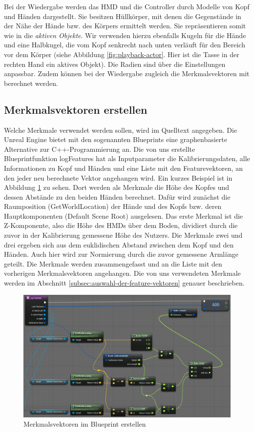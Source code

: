 Bei der Wiedergabe werden das HMD und die Controller durch Modelle von Kopf und Händen dargestellt. Sie besitzen Hüllkörper, mit denen die Gegenstände in der Nähe der Hände bzw. des Körpers ermittelt werden. Sie repräsentieren somit wie in \cite{scene-grok} die \textit{aktiven Objekte}. Wir verwenden hierzu ebenfalls Kugeln für die Hände und eine Halbkugel, die vom Kopf senkrecht nach unten verläuft für den Bereich vor dem Körper (siehe Abbildung \ref{fig:playback-actor}. Hier ist die Tasse in der rechten Hand ein aktives Objekt). Die Radien sind über die Einstellungen anpassbar. Zudem können bei der Wiedergabe zugleich die Merkmalsvektoren mit berechnet werden.

\subsection{Merkmalsvektoren erstellen}
\label{subsec:merkmalsvektoren-erstellen}
Welche Merkmale verwendet werden sollen, wird im Quelltext angegeben. Die Unreal Engine bietet mit den sogenannten Blueprints eine graphenbasierte Alternative zur C++-Programmierung an. Die von uns erstellte Blueprintfunktion \glqq{}logFeatures\grqq{} hat als Inputparameter die Kalibrierungsdaten, alle Informationen zu Kopf und Händen und eine Liste mit den Featurevektoren, an den jeder neu berechnete Vektor angehangen wird. Ein kurzes Beispiel ist in Abbildung \ref{fig:log-features} zu sehen. Dort werden als Merkmale die Höhe des Kopfes und dessen Abstände zu den beiden Händen berechnet. Dafür wird zunächst die Raumposition (\glqq{}GetWorldLocation\grqq{}) der Hände und des Kopfs bzw. deren Hauptkomponenten (\glqq{}Default Scene Root\grqq{}) ausgelesen. Das erste Merkmal ist die Z-Komponente, also die Höhe des HMDs über dem Boden, dividiert durch die zuvor in der Kalibrierung gemessene Höhe des Nutzers. Die Merkmale zwei und drei ergeben sich aus dem euklidischen Abstand zwischen dem Kopf und den Händen. Auch hier wird zur Normierung durch die zuvor gemessene Armlänge geteilt. Die Merkmale werden zusammengefasst und an die Liste mit den vorherigen Merkmalsvektoren angehangen. Die von uns verwendeten Merkmale werden im Abschnitt \ref{subsec:auswahl-der-feature-vektoren} genauer beschrieben.
\begin{figure}[hbtp]
\includegraphics[width=1.0\linewidth]{LogFeatures.png}
\caption{Merkmalsvektoren im Blueprint erstellen}
\label{fig:log-features}
\end{figure}

